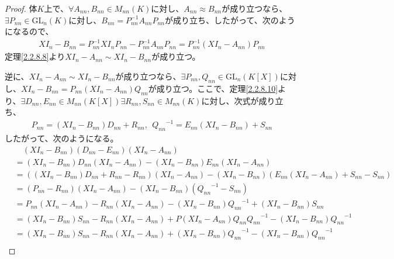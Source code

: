 \documentclass[dvipdfmx]{jsarticle}
\begin{document}
\begin{proof}
体$K$上で、$\forall A_{nn},B_{nn} \in M_{nn}(K)$に対し、$A_{nn} \approx B_{nn}$が成り立つなら、$\exists P_{nn} \in {\mathrm{GL}}_{n}(K)$に対し、$B_{nn} = P_{nn}^{- 1}A_{nn}P_{nn}$が成り立ち、したがって、次のようになるので、
\begin{align*}
XI_{n} - B_{nn} = P_{nn}^{- 1}XI_{n}P_{nn} - P_{nn}^{- 1}A_{nn}P_{nn} = P_{nn}^{- 1}\left( XI_{n} - A_{nn} \right)P_{nn}
\end{align*}
定理\ref{2.2.8.8}より$XI_{n} - A_{nn} \sim XI_{n} - B_{nn}$が成り立つ。\par
逆に、$XI_{n} - A_{nn} \sim XI_{n} - B_{nn}$が成り立つなら、$\exists P_{nn},Q_{nn} \in {\mathrm{GL}}_{n}\left( K[ X] \right)$に対し、$XI_{n} - B_{nn} = P_{nn}\left( XI_{n} - A_{nn} \right)Q_{nn}$が成り立つ。ここで、定理\ref{2.2.8.10}より、$\exists D_{nn},E_{nn} \in M_{nn}\left( K[ X] \right)\exists R_{nn},S_{nn} \in M_{nn}(K)$に対し、次式が成り立ち、
\begin{align*}
P_{nn} = \left( XI_{n} - B_{nn} \right)D_{nn} + R_{nn},\ \ {Q_{nn}}^{- 1} = E_{nn}\left( XI_{n} - B_{nn} \right) + S_{nn}
\end{align*}
したがって、次のようになる。
\begin{align*}
&\quad \left( XI_{n} - B_{nn} \right)\left( D_{nn} - E_{nn} \right)\left( XI_{n} - A_{nn} \right)\\
&= \left( XI_{n} - B_{nn} \right)D_{nn}\left( XI_{n} - A_{nn} \right) - \left( XI_{n} - B_{nn} \right)E_{nn}\left( XI_{n} - A_{nn} \right)\\
&= \left( \left( XI_{n} - B_{nn} \right)D_{nn} + R_{nn} - R_{nn} \right)\left( XI_{n} - A_{nn} \right) - \left( XI_{n} - B_{nn} \right)\left( E_{nn}\left( XI_{n} - A_{nn} \right) + S_{nn} - S_{nn} \right)\\
&= \left( P_{nn} - R_{nn} \right)\left( XI_{n} - A_{nn} \right) - \left( XI_{n} - B_{nn} \right)\left( {Q_{nn}}^{- 1} - S_{nn} \right)\\
&= P_{nn}\left( XI_{n} - A_{nn} \right) - R_{nn}\left( XI_{n} - A_{nn} \right) - \left( XI_{n} - B_{nn} \right){Q_{nn}}^{- 1} + \left( XI_{n} - B_{nn} \right)S_{nn}\\
&= \left( XI_{n} - B_{nn} \right)S_{nn} - R_{nn}\left( XI_{n} - A_{nn} \right) + P\left( XI_{n} - A_{nn} \right)Q_{nn}{Q_{nn}}^{- 1} - \left( XI_{n} - B_{nn} \right){Q_{nn}}^{- 1}\\
&= \left( XI_{n} - B_{nn} \right)S_{nn} - R_{nn}\left( XI_{n} - A_{nn} \right) + \left( XI_{n} - B_{nn} \right){Q_{nn}}^{- 1} - \left( XI_{n} - B_{nn} \right){Q_{nn}}^{- 1}\\

\end{align*}
\end{proof}
\end{document}
